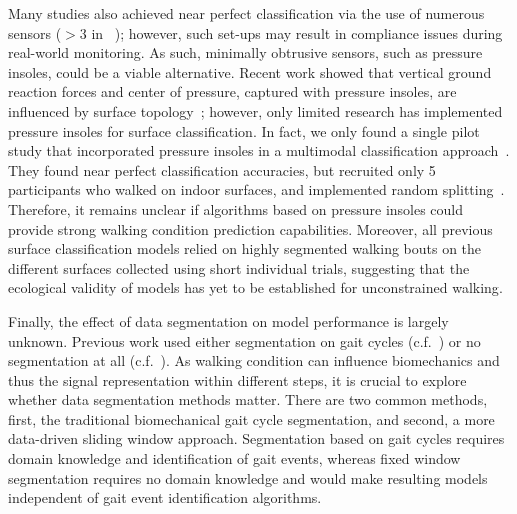 \documentclass[sensors,article,submit,pdftex,moreauthors]{Definitions/mdpi}
\begin{document}
\textcolor{revision}{Many studies also achieved near perfect classification via the use of numerous sensors ($>3$ in ~\cite{Shah_2022, mcquire2021uneven, ng2022machine, chauhan2025classifying, shin2021locomotion, camargo2021machine, seo2025gait}); however, such set-ups  may result in compliance issues during real-world monitoring.} \textcolor{revision}{As such,} minimally obtrusive sensors, such as pressure insoles, could be a viable alternative. \textcolor{revision}{Recent work showed that vertical ground reaction forces and center of pressure, captured with pressure insoles, are influenced by surface topology~\cite{warmerdam2024walking}; however, only limited research has implemented pressure insoles for surface classification. In fact, we only found a single pilot study that incorporated pressure insoles in a multimodal classification approach~\cite{seo2025gait}. They found near perfect classification accuracies, but recruited only 5 participants who walked on indoor surfaces, and implemented random splitting~\cite{seo2025gait}. Therefore, it remains unclear if} algorithms based on pressure insoles could provide strong walking condition prediction capabilities. Moreover, \textcolor{revision}{all} previous surface classification \textcolor{revision}{models} relied on \textcolor{revision}{highly segmented walking bouts on the different surfaces} collected using short individual \textcolor{revision}{trials}, suggesting that the ecological validity of \textcolor{revision}{ models} has yet to be established \textcolor{revision}{for unconstrained walking}.

\textcolor{revision}{Finally}, the effect of data segmentation on model performance is largely unknown. Previous work used either segmentation on gait cycles (\textcolor{revision2}{c.f.}~\cite{Shah_2022}) or no segmentation at all (\textcolor{revision2}{c.f.}~\cite{chauhan2025classifying}). As walking condition can influence biomechanics and thus the signal representation within different steps, it is crucial to explore whether data segmentation methods matter. There are two common methods, first, the traditional biomechanical gait cycle segmentation, and second, a more data-driven sliding window approach. Segmentation based on gait cycles requires domain knowledge and identification of gait events, whereas fixed window segmentation requires no domain knowledge and would make resulting models independent of gait event identification algorithms. 
\end{document}
